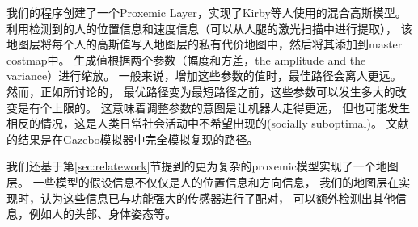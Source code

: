 我们的程序创建了一个Proxemic Layer，实现了Kirby等人使用的混合高斯模型。 
利用检测到的人的位置信息和速度信息（可以从人腿的激光扫描中进行提取），
该地图层将每个人的高斯值写入地图层的私有代价地图中，然后将其添加到master costmap中。 
生成值根据两个参数（幅度和方差，the amplitude and the variance）进行缩放。 
一般来说，增加这些参数的值时，最佳路径会离人更远。 然而，正如\cite{lu2013tuning}所讨论的，
最优路径变为最短路径之前，这些参数可以发生多大的改变是有个上限的。 
这意味着调整参数的意图是让机器人走得更远，
但也可能发生相反的情况，这是人类日常社会活动中不希望出现的(socially suboptimal)。 
文献\cite{lu2013tuning}的结果是在Gazebo模拟器中完全模拟复现的路径。


我们还基于第\ref{sec:relatework}节提到的更为复杂的proxemic模型实现了一个地图层。 
一些模型的假设信息不仅仅是人的位置信息和方向信息，
我们的地图层在实现时，认为这些信息已与功能强大的传感器进行了配对，
可以额外检测出其他信息，例如人的头部、身体姿态等。

